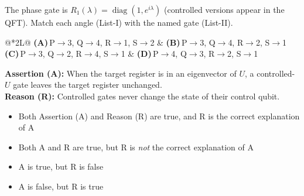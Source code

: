\documentclass[11pt,a4paper]{article}
\newcommand{\optlabel}[1]{\textbf{(#1)}}
\newenvironment{qitem}[1]{\begin{list}{}{\setlength{\leftmargin}{3.3em}\setlength{\labelwidth}{3.1em}%
  \setlength{\labelsep}{0.2em}\setlength{\topsep}{3pt}\setlength{\parsep}{3pt}}\item[\textbf{Q.#1}\hfill]}{\end{list}}
\newcommand{\qsep}{\par\vspace{2pt}{\color{black!15}\hrule}\vspace{4pt}}
\begin{document}
\begin{qitem}{36}
The phase gate is $R_1(\lambda) = \operatorname{diag}(1, e^{i\lambda})$ (controlled versions appear in the QFT). Match each angle (List-I) with the named gate (List-II).
\par\smallskip{}
\par\smallskip\noindent\begin{tabularx}{\linewidth}{@{}*{2}{L}@{}}
\optlabel{A}\,P$\to$3, Q$\to$4, R$\to$1, S$\to$2 & \optlabel{B}\,P$\to$3, Q$\to$4, R$\to$2, S$\to$1 \\[3pt]
\optlabel{C}\,P$\to$3, Q$\to$2, R$\to$4, S$\to$1 & \optlabel{D}\,P$\to$4, Q$\to$3, R$\to$2, S$\to$1
\end{tabularx}
\end{qitem}
\qsep

\begin{qitem}{37}
\textbf{Assertion (A):} When the target register is in an eigenvector of $U$, a controlled-$U$ gate leaves the target register unchanged.\\[1mm]
\textbf{Reason (R):} Controlled gates never change the state of their control qubit.
\begin{itemize}[leftmargin=2.6em, labelsep=0.4em, itemsep=2pt, topsep=3pt]
\item[\optlabel{A}] Both Assertion (A) and Reason (R) are true, and R is the correct explanation of A
\item[\optlabel{B}] Both A and R are true, but R is \emph{not} the correct explanation of A
\item[\optlabel{C}] A is true, but R is false
\item[\optlabel{D}] A is false, but R is true
\end{itemize}
\end{qitem}
\qsep
\end{document}
